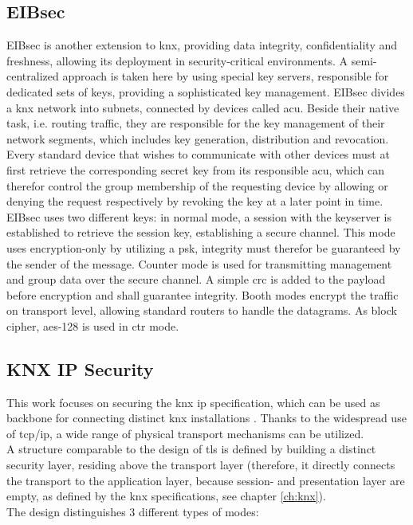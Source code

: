 \subsection{EIBsec}

EIBsec is another extension to \gls{knx}, providing data integrity, confidentiality and freshness, allowing its deployment in security-critical environments.
A semi-centralized approach is taken here by using special key servers, responsible for dedicated sets
of keys, providing a sophisticated key management. EIBsec divides a \gls{knx} network into subnets, connected by devices called \gls{acu}. Beside their native
task, i.e. routing traffic, they
 are responsible for the key management of their network segments, which includes key generation, distribution and revocation. Every standard device that
 wishes to communicate with other devices must at first retrieve the corresponding secret key from its responsible \gls{acu}, which can therefor control the
 group membership of the requesting device by allowing or denying the request respectively by revoking the key at a later point in time.
\\
EIBsec uses two different keys: in normal mode, a session with the keyserver is established to retrieve the session key, establishing a secure channel.
This mode uses encryption-only by utilizing a \gls{psk}, integrity must therefor be guaranteed by the sender of the message. Counter mode is used for transmitting management and
group data over the secure channel. A simple \gls{crc} is added to the payload before encryption and shall guarantee integrity. Booth modes encrypt the traffic
on transport level, allowing standard routers to handle the datagrams. As block cipher, \gls{aes}-128 is used in \gls{ctr} mode.

\subsection{KNX IP Security}

This work focuses on securing the \gls{knx} \gls{ip} specification, which can be used as backbone for connecting distinct \gls{knx} installations \cite{5195839}.
Thanks to the widespread use of \gls{tcp}/\gls{ip}, a wide range of physical transport mechanisms can be utilized.
\\
A structure comparable to the design of \gls{tls} is defined by building a distinct security layer, residing above the transport layer (therefore, it directly
connects the transport to the application layer, because session- and presentation layer are empty, as defined by the \gls{knx} specifications, see chapter
\ref{ch:knx}).
\\
The design distinguishes 3 different types of modes: 

